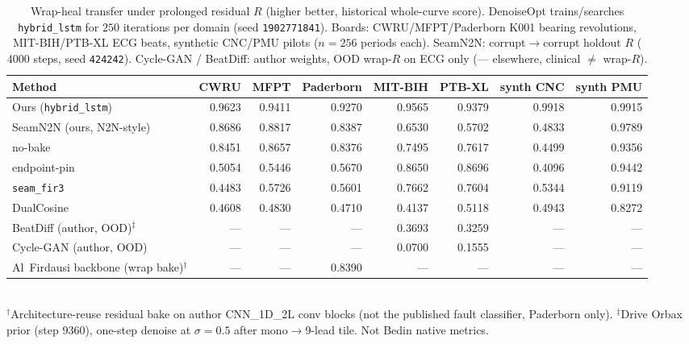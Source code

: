 \begin{table}[t]
  \centering
  \caption{Wrap-heal transfer under prolonged residual $R$ (higher better, historical whole-curve score).
    DenoiseOpt trains/searches \texttt{hybrid\_lstm} for $250$ iterations per domain (seed \texttt{1902771841}).
    Boards: CWRU/MFPT/Paderborn K001 bearing revolutions, MIT-BIH/PTB-XL ECG beats, synthetic CNC/PMU pilots
    ($n{=}256$ periods each). SeamN2N: corrupt$\to$corrupt holdout $R$ ($4000$ steps, seed \texttt{424242}).
    Cycle-GAN / BeatDiff: author weights, OOD wrap-$R$ on ECG only (--- elsewhere, clinical $\neq$ wrap-$R$).}
  \label{tab:transfer-main}
  \setlength{\tabcolsep}{2.2pt}
  \begin{tabular}{@{}lrrrrrrr@{}}
    \toprule
    Method & CWRU & MFPT & Paderborn & MIT-BIH & PTB-XL & synth CNC & synth PMU \\
    \midrule
    Ours (\texttt{hybrid\_lstm}) & 0.9623 & 0.9411 & 0.9270 & 0.9565 & 0.9379 & 0.9918 & 0.9915 \\
    SeamN2N (ours, N2N-style) & 0.8686 & 0.8817 & 0.8387 & 0.6530 & 0.5702 & 0.4833 & 0.9789 \\
    no-bake & 0.8451 & 0.8657 & 0.8376 & 0.7495 & 0.7617 & 0.4499 & 0.9356 \\
    endpoint-pin & 0.5054 & 0.5446 & 0.5670 & 0.8650 & 0.8696 & 0.4096 & 0.9442 \\
    \texttt{seam\_fir3} & 0.4483 & 0.5726 & 0.5601 & 0.7662 & 0.7604 & 0.5344 & 0.9119 \\
    DualCosine & 0.4608 & 0.4830 & 0.4710 & 0.4137 & 0.5118 & 0.4943 & 0.8272 \\
    BeatDiff (author, OOD)$^\ddagger$ & --- & --- & --- & 0.3693 & 0.3259 & --- & --- \\
    Cycle-GAN (author, OOD) & --- & --- & --- & 0.0700 & 0.1555 & --- & --- \\
    Al~Firdausi backbone (wrap bake)$^\dagger$ & --- & --- & 0.8390 & --- & --- & --- & --- \\
    \bottomrule
  \end{tabular}\\[0.35em]
  {\footnotesize $^\dagger$Architecture-reuse residual bake on author CNN\_1D\_2L conv blocks (not the published fault classifier, Paderborn only).
    $^\ddagger$Drive Orbax prior (step $9360$), one-step denoise at $\sigma{=}0.5$ after mono$\to$9-lead tile. Not Bedin native metrics.}
\end{table}

